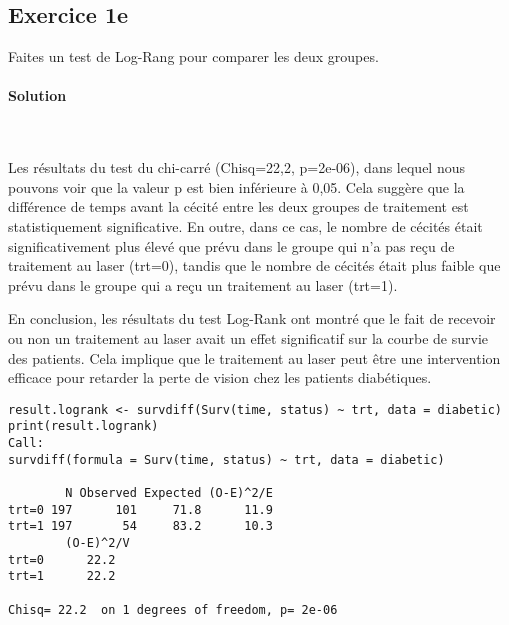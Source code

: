 \documentclass[../main.tex]{subfiles}
\begin{document}
\begin{CJK*}{UTF8}{gbsn}

\section*{Exercice 1e}
Faites un test de Log-Rang pour comparer les deux groupes.
    
\paragraph{Solution}\
    
Les résultats du test du chi-carré (Chisq=22,2, p=2e-06), dans lequel nous pouvons voir que la valeur p est bien inférieure à 0,05. Cela suggère que la différence de temps avant la cécité entre les deux groupes de traitement est statistiquement significative. En outre, dans ce cas, le nombre de cécités était significativement plus élevé que prévu dans le groupe qui n'a pas reçu de traitement au laser (trt=0), tandis que le nombre de cécités était plus faible que prévu dans le groupe qui a reçu un traitement au laser (trt=1).
    
En conclusion, les résultats du test Log-Rank ont montré que le fait de recevoir ou non un traitement au laser avait un effet significatif sur la courbe de survie des patients. Cela implique que le traitement au laser peut être une intervention efficace pour retarder la perte de vision chez les patients diabétiques.
    
\begin{lstlisting}
result.logrank <- survdiff(Surv(time, status) ~ trt, data = diabetic)
print(result.logrank)
Call:
survdiff(formula = Surv(time, status) ~ trt, data = diabetic)
    
        N Observed Expected (O-E)^2/E
trt=0 197      101     71.8      11.9
trt=1 197       54     83.2      10.3
        (O-E)^2/V
trt=0      22.2
trt=1      22.2
    
Chisq= 22.2  on 1 degrees of freedom, p= 2e-06 
\end{lstlisting}

\end{CJK*}
\end{document}
